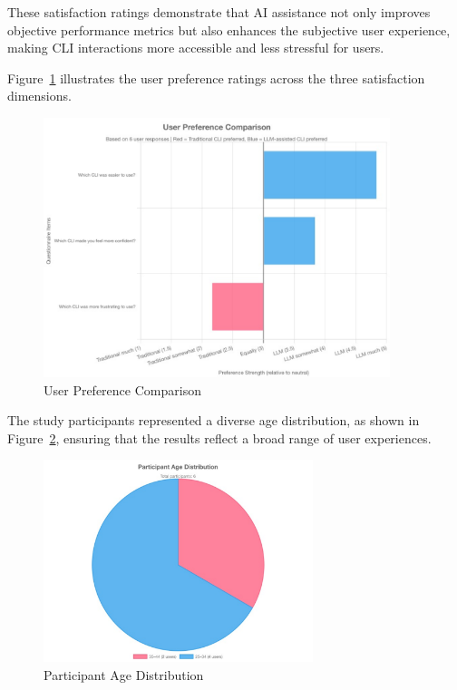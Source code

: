 These satisfaction ratings demonstrate that AI assistance not only improves objective performance metrics but also enhances the subjective user experience, making CLI interactions more accessible and less stressful for users.

Figure~\ref{fig:user_satisfaction} illustrates the user preference ratings across the three satisfaction dimensions.

\begin{figure}[h]
	\centering
	\includegraphics[width=0.9\textwidth]{assets/figures/user_satisfaction.pdf}
	\caption{User Preference Comparison}
	\label{fig:user_satisfaction}
\end{figure}

The study participants represented a diverse age distribution, as shown in Figure~\ref{fig:demographics_age}, ensuring that the results reflect a broad range of user experiences.

\begin{figure}[h]
	\centering
	\includegraphics[width=0.7\textwidth]{assets/figures/demographics_age.pdf}
	\caption{Participant Age Distribution}
	\label{fig:demographics_age}
\end{figure}

